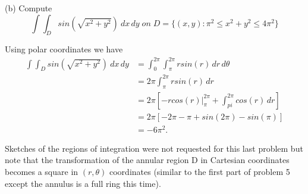 \documentclass[11pt]{article}
\begin{document}
(b) Compute
$$\int \int_D sin(\sqrt{x^2 + y^2}) \: dx \, dy \;on\; D = \{(x,y) : \pi^2 \leq x^2 + y^2 \leq 4\pi^2\} $$

Using polar coordinates we have
\begin{align*}
\int \int_D sin(\sqrt{x^2 + y^2}) \: dx \, dy & = \int_{0}^{2\pi} \int_{\pi}^{2\pi} rsin(r) \, dr \, d\theta \\
& = 2\pi \int_{\pi}^{2\pi} rsin(r) \, dr \\
& = 2\pi \left[-rcos(r) \Bigr\rvert_{\pi}^{2\pi} + \int_{pi}^{2\pi} cos(r) \, dr \right] \\
& = 2\pi \left[ -2\pi - \pi + sin(2\pi) - sin(\pi) \right] \\
& = -6\pi^2.
\end{align*}

Sketches of the regions of integration were not requested for this last problem but note that the transformation of the annular region D in Cartesian coordinates becomes a square in $(r,\theta)$ coordinates (similar to the first part of problem 5 except the annulus is a full ring this time).
\end{document}

